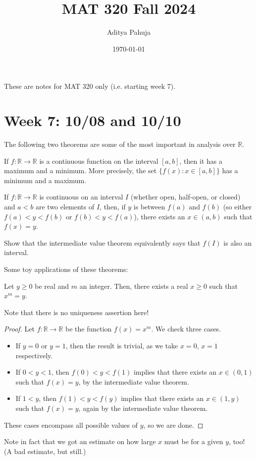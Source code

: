 \documentclass[10pt]{scrartcl}
\title{\vspace{-2.0cm} MAT 320 Fall 2024}
\author{\large Aditya Pahuja}
\date{\large \today}
\providecommand{\RR}{\mathbb R}
\providecommand{\ii}{\item}
\begin{document}
\maketitle
\tableofcontents
\pagebreak

These are notes for MAT 320 only (i.e. starting week 7).

\setcounter{section}{6}
\section{Week 7: 10/08 and 10/10}
The following two theorems are some of the most important
in analysis over $\RR$.
\begin{theorem}\label{wk7:thm:weierstrass}
	If $f\colon\RR\to\RR$ is a continuous function on the interval $[a, b]$,
	then it has a maximum and a minimum.
	More precisely, the set $\{f(x) : x\in[a,b]\}$ has a minimum and a maximum.
\end{theorem}

\begin{theorem}\label{wk7:thm:ivt}
	If $f\colon\RR\to\RR$ is continuous on an interval $I$
	(whether open, half-open, or closed)
	and $a < b$ are two elements of $I$, then,
	if $y$ is between $f(a)$ and $f(b)$
	(so either $f(a) < y < f(b)$ or $f(b) < y < f(a)$),
	there exists an $x\in(a,b)$ such that $f(x) = y$.
\end{theorem}

\begin{exercise}
	Show that the intermediate value theorem equivalently says that
	$f(I)$ is also an interval.
\end{exercise}

Some toy applications of these theorems:
\begin{theorem*}
	Let $y\ge 0$ be real and $m$ an integer.
	Then, there exists a real $x\ge 0$ such that $x^m = y$.
\end{theorem*}

Note that there is no uniqueness assertion here!
\begin{proof}
	Let $f\colon \RR\to\RR$ be the function $f(x) = x^m$.
	We check three cases.
	\begin{itemize}
		\ii If $y = 0$ or $y = 1$, then the result is trivial, as
		we take $x = 0$, $x = 1$ respectively.
		\ii If $0 < y < 1$, then $f(0) < y < f(1)$ implies that
		there exists an $x\in(0,1)$ such that $f(x) = y$,
		by the intermediate value theorem.
		\ii If $1 < y$, then $f(1) < y < f(y)$ implies that
		there exists an $x\in(1,y)$ such that $f(x) = y$,
		again by the intermediate value theorem.
	\end{itemize}
	These cases encompass all possible values of $y$, so we are done.
\end{proof}
Note in fact that we got an estimate on how large $x$ must be
for a given $y$, too! (A bad estimate, but still.)
\end{document}

